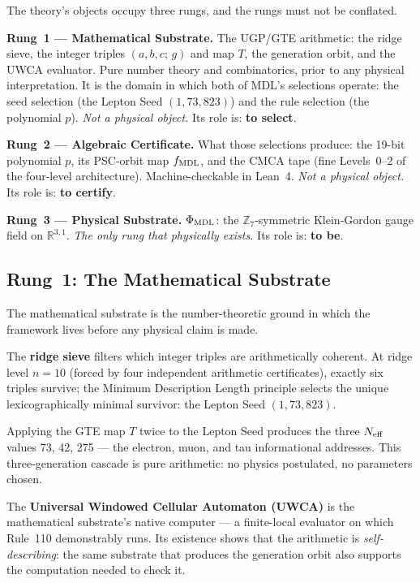 \documentclass[11pt,a4paper]{article}
\newcommand{\term}[1]{\textbf{#1}}
\newcommand{\PhiMDL}{\Phi_{\rm MDL}}
\newcommand{\ZS}{\mathbb{Z}_7}
\newcommand{\poly}{p}
\newcommand{\fMDL}{f_{\rm MDL}}
\begin{document}
\begin{tcolorbox}[colback=boxgreen,colframe=green!50!black,
  title=The Ontological Ladder (canonical definition from P48 Chapter~4)]
The theory's objects occupy three rungs, and the rungs must not be conflated.

\medskip\noindent
\textbf{Rung~1 --- Mathematical Substrate.}
The UGP/GTE arithmetic: the ridge sieve, the integer triples $(a,b,c;\,g)$
and map $T$, the generation orbit, and the UWCA evaluator.
Pure number theory and combinatorics, prior to any physical interpretation.
It is the domain in which both of MDL's selections operate: the seed
selection (the Lepton Seed $(1, 73, 823)$) and the rule selection
(the polynomial $\poly$).
\emph{Not a physical object.}
Its role is: \textbf{to select}.

\medskip\noindent
\textbf{Rung~2 --- Algebraic Certificate.}
What those selections produce: the 19-bit polynomial $\poly$,
its PSC-orbit map $\fMDL$, and the CMCA tape
(fine Levels~0--2 of the four-level architecture).
Machine-checkable in Lean~4.
\emph{Not a physical object.}
Its role is: \textbf{to certify}.

\medskip\noindent
\textbf{Rung~3 --- Physical Substrate.}
$\PhiMDL$: the $\ZS$-symmetric Klein-Gordon gauge field on
$\mathbb{R}^{3,1}$.
\emph{The only rung that physically exists.}
Its role is: \textbf{to be}.
\end{tcolorbox}

\subsection{Rung~1: The Mathematical Substrate}

The mathematical substrate is the number-theoretic ground in which the
framework lives before any physical claim is made.

\medskip
The \term{ridge sieve} filters which integer triples are arithmetically
coherent.
At ridge level $n = 10$ (forced by four independent arithmetic certificates),
exactly six triples survive; the Minimum Description Length principle selects
the unique lexicographically minimal survivor: the Lepton Seed
$(1, 73, 823)$.

\medskip
Applying the GTE map $T$ twice to the Lepton Seed produces the three
$N_{\rm eff}$ values 73, 42, 275 --- the electron, muon, and tau
informational addresses.
This three-generation cascade is pure arithmetic: no physics postulated,
no parameters chosen.

\medskip
The \term{Universal Windowed Cellular Automaton (UWCA)} is the mathematical
substrate's native computer --- a finite-local evaluator on which Rule~110
demonstrably runs.
Its existence shows that the arithmetic is \emph{self-describing}: the same
substrate that produces the generation orbit also supports the computation
needed to check it.
\end{document}
